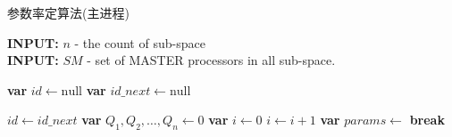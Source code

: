 \begin{algorithm}[H]
\caption{参数率定算法(主进程)}\label{algorithm_params}
\begin{flushleft}
    \textbf{INPUT:} $n$ - the count of sub-space\\
    \textbf{INPUT:} $SM$ - set of MASTER processors in all sub-space.
\end{flushleft}
\begin{algorithmic}[1]

\State \textbf{var} $id \gets \text{null} $
\State \textbf{var} $id\_next \gets \text{null} $
\State {}

  
    \State $id\gets id\_next $
        \State \textbf{var} $Q_1,Q_2,\dots,Q_n \gets 0 $
        \State \textbf{var} $i \gets 0$
            \State $i \gets i+1 $
            \State \textbf{var} $params \gets $    
            \State {}      
            \State {}  
            \State {}
            \State {}
        \EndFor
        \State {}  
            \State \textbf{break}
        \EndIf
    \EndWhile
\EndWhile
\end{algorithmic}
\end{algorithm}

